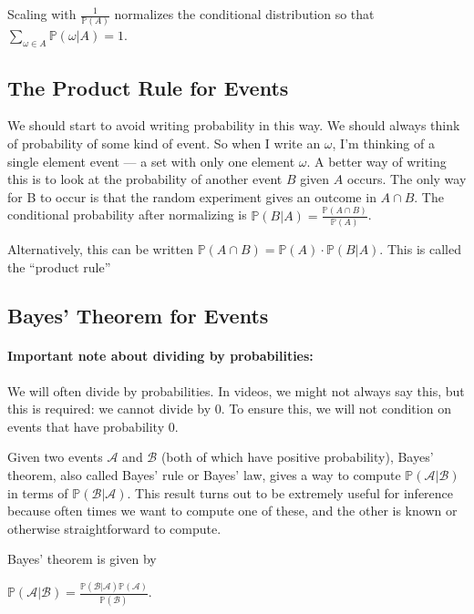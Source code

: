 \documentclass[6008notes.tex]{subfiles}
\begin{document}
Scaling with $\frac{1}{\mathbb{P}(A)}$ normalizes the conditional distribution so that $\sum_{\omega \in A} \mathbb{P}(\omega | A) = 1$.

\subsection{The Product Rule for Events}

We should start to avoid writing probability in this way. We should always think of probability of some kind of event. So when I write an $\omega$, I'm thinking of a single element event --- a set with only one element $\omega$. A better way of writing this is to look at the probability of another event $B$ given $A$ occurs. The only way for B to occur is that the random experiment gives an outcome in $A \cap B$. The conditional probability after normalizing is $\mathbb{P}(B | A) = \frac{\mathbb{P}(A \cap B)}{\mathbb{P}(A)}$. 

Alternatively, this can be written $\mathbb{P}(A \cap B) = \mathbb{P}(A) \cdot \mathbb{P}(B | A)$. This is called the ``product rule''


\subsection{Bayes' Theorem for Events}

\paragraph{Important note about dividing by probabilities:} We will often divide by probabilities. In videos, we might not always say this, but this is required: we cannot divide by 0. To ensure this, we will not condition on events that have probability 0.

Given two events $\mathcal{A}$ and $\mathcal{B}$ (both of which have positive probability), Bayes' theorem, also called Bayes' rule or Bayes' law, gives a way to compute $\mathbb {P}(\mathcal{A} | \mathcal{B})$ in terms of $\mathbb {P}(\mathcal{B} | \mathcal{A})$. This result turns out to be extremely useful for inference because often times we want to compute one of these, and the other is known or otherwise straightforward to compute.

Bayes' theorem is given by

{\centering$\mathbb {P}(\mathcal{A} | \mathcal{B}) = \frac{\mathbb {P}(\mathcal{B} | \mathcal{A}) \mathbb {P}(\mathcal{A})}{\mathbb {P}(\mathcal{B})}.$ \par}
 
\end{document}
